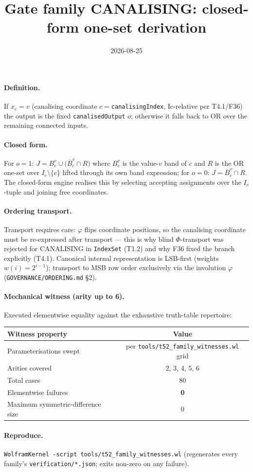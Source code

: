 \documentclass{article}
\title{Gate family CANALISING: closed-form one-set derivation}
\date{2026-08-25}
\begin{document}
\maketitle

\paragraph{Definition.} If $x_{c}=v$ (canalising coordinate $c=$\texttt{canalisingIndex}, Ic-relative per T4.1/F36) the output is the fixed \texttt{canalisedOutput} $o$; otherwise it falls back to OR over the remaining connected inputs.

\paragraph{Closed form.} For $o=1$: $J=B_{c}^{v}\cup\bigl(\overline{B}_{c}^{v}\cap R\bigr)$ where $B^{v}_c$ is the value-$v$ band of $c$ and $R$ is the OR one-set over $I_c\setminus\{c\}$ lifted through its own band expression; for $o=0$: $J=\overline{B}^{v}_{c}\cap R$. The closed-form engine realises this by selecting accepting assignments over the $I_c$-tuple and joining free coordinates.

\paragraph{Ordering transport.} Transport requires care: $\varphi$ flips coordinate positions, so the canalising coordinate must be re-expressed after transport --- this is why blind $\Phi$-transport was rejected for CANALISING in \texttt{IndexSet} (T1.2) and why F36 fixed the branch explicitly (T4.1).
Canonical internal representation is LSB-first (weights $w(i)=2^{i-1}$);
transport to MSB row order exclusively via the involution $\varphi$
(\texttt{GOVERNANCE/ORDERING.md} \S2).

\paragraph{Mechanical witness (arity up to 6).} Executed elementwise equality
against the exhaustive truth-table repertoire:
\begin{center}
\begin{tabular}{lc}
\hline
Witness property & Value \\ \hline
Parameterisations swept & per \texttt{tools/t52_family_witnesses.wl} grid \\
Arities covered & 2, 3, 4, 5, 6 \\
Total cases & 80 \\
Elementwise failures & \textbf{0} \\
Maximum symmetric-difference size & 0 \\ \hline
\end{tabular}
\end{center}

\paragraph{Reproduce.} \texttt{WolframKernel -script tools/t52_family_witnesses.wl}
(regenerates every family's \texttt{verification/*.json}; exits non-zero on any failure).
\end{document}
